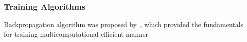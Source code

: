 \subsubsection{Training Algorithms}
Backpropagation algorithm was proposed by~\citet{werbos1975beyond}, which provided the fundamentals for training multicomputational efficient manner